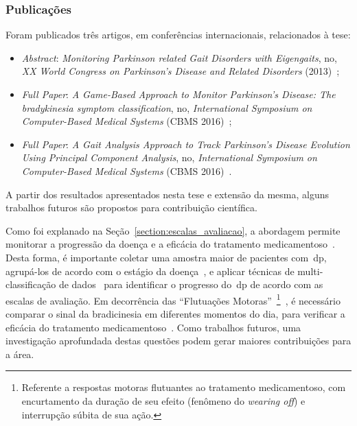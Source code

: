 \subsubsection{Publicações}
Foram publicados três artigos, em conferências internacionais, relacionados à tese: 
  \begin{itemize}
   \item \textit{Abstract}: \textit{Monitoring Parkinson related Gait Disorders with Eigengaits}, no, \textit{XX World Congress on Parkinson's Disease and Related Disorders} (2013)~\cite{lmmeigengaits2013};
   \item \textit{Full Paper}: \textit{A Game-Based Approach to Monitor Parkinson’s Disease: The bradykinesia symptom classification}, no, \textit{International Symposium on Computer-Based Medical Systems} (CBMS 2016)~\cite{lmmcbmsgame2016};
   \item \textit{Full Paper}: \textit{A Gait Analysis Approach to Track Parkinson’s Disease Evolution Using Principal Component Analysis}, no, \textit{International Symposium on Computer-Based Medical Systems} (CBMS 2016)~\cite{lmmcbmsgait2016}.
  \end{itemize}

A partir dos resultados apresentados nesta tese e extensão da mesma, alguns trabalhos futuros são propostos para contribuição científica.

Como foi explanado na Seção~\ref{section:escalas_avaliacao}, a abordagem permite monitorar a progressão da doença e a eficácia do tratamento medicamentoso~\cite{updrs87,goul05}. Desta forma, é importante coletar uma amostra maior de pacientes com~\ac{dp}, agrupá-los de acordo com o estágio da doença~\cite{goul05}, e aplicar técnicas de multi-classificação de dados~\cite{multisvm2011} para identificar o progresso do~\ac{dp} de acordo com as escalas de avaliação. Em decorrência das ``Flutuações Motoras''~\footnote{Referente a respostas motoras flutuantes ao tratamento medicamentoso, com encurtamento da duração de seu efeito (fenômeno do \textit{wearing off}) e interrupção súbita de sua ação.}~\cite{protpar010}, é necessário comparar o sinal da bradicinesia em diferentes momentos do dia, para verificar a eficácia do tratamento medicamentoso~\cite{protpar010}. Como trabalhos futuros, uma investigação aprofundada destas questões podem gerar maiores contribuições para a área.

